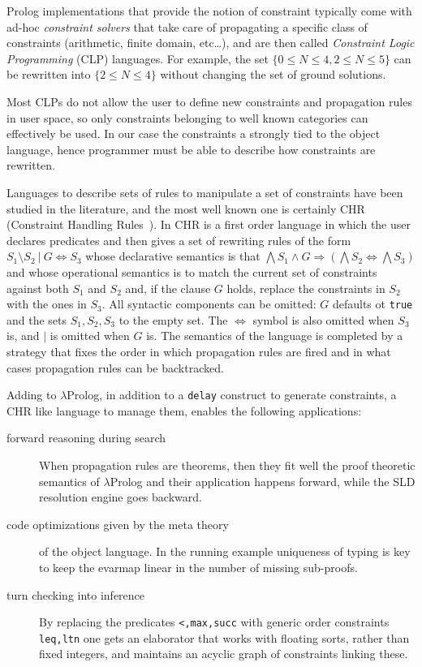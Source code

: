 \documentclass{easychair}
\begin{document}
Prolog implementations that provide the notion of constraint typically
come with ad-hoc \emph{constraint solvers} that take care of
propagating a specific class of constraints (arithmetic, finite
domain, etc\ldots), and are then called \emph{Constraint Logic
Programming} (CLP) languages.  For example, the set $\{0 \leq N \leq
4, 2 \leq N \leq 5\}$ can be rewritten into $\{2 \leq N \leq 4\}$
without changing the set of ground solutions.

Most CLPs do not allow the user to define new constraints and
propagation rules in user space, so only constraints belonging to well
known categories can effectively be used.  In our case the constraints
a strongly tied to the object language, hence programmer must be able
to describe how constraints are rewritten.

Languages to describe sets of rules to manipulate a set of
constraints have been studied in the literature, and the most well
known one is certainly CHR (Constraint Handling Rules~\cite{chr}).
In CHR is a first order language in which the user declares predicates
and then gives a set of rewriting rules of the form $S_1 \setminus S_2 ~|~
G \iff S_3$ whose declarative semantics is that $\bigwedge S_1 \wedge
G \Rightarrow (\bigwedge S_2 \iff \bigwedge S_3)$ and whose
operational semantics is to match the current set of constraints
against both $S_1$ and $S_2$ and, if the clause $G$ holds, replace the
constraints in $S_2$ with the ones in $S_3$. All syntactic components
can be omitted: $G$ defaults ot \verb+true+ and the sets $S_1,S_2,S_3$
to the empty set. The $\iff$ symbol is also omitted when $S_3$ is, and
$|$ is omitted when $G$ is. The semantics of the language is completed
by a strategy that fixes the order in which propagation rules are
fired and in what cases propagation rules can be backtracked.

Adding to $\lambda$Prolog, in addition to a \verb+delay+ construct to
generate constraints, a CHR like language to manage them,
enables the following applications:
\begin{description}
\item[forward reasoning during search] When propagation rules are theorems,
	then they fit well the proof theoretic semantics of $\lambda$Prolog
	and their application happens forward, while the SLD resolution engine
	goes backward.
\item[code optimizations given by the meta theory] of the object
	language.  In the running example uniqueness of typing is key to keep
	the evarmap linear in the number of missing sub-proofs.
\item[turn checking into inference]  By replacing the
	predicates \verb+<,max,succ+ with generic order constraints
	\verb+leq,ltn+ one gets an elaborator that works with floating sorts,
	rather than fixed integers, and maintains an acyclic graph of
	constraints linking these.
\end{description}
\end{document}
